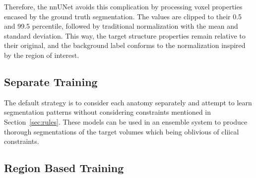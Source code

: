\documentclass[12pt,twoside]{report}
\begin{document}
Therefore, the nnUNet avoids this complication by processing voxel properties encased by the ground truth segmentation. The values are clipped to their 0.5 and 99.5 percentile, followed by traditional normalization with the mean and standard deviation. This way, the target structure properties remain relative to their original, and the background label conforms to the normalization inspired by the region of interest.

\subsection{Separate Training}

The default strategy is to consider each anatomy separately and attempt to learn segmentation patterns without considering constraints mentioned in Section~\ref{sec:rules}. These models can be used in an ensemble system to produce thorough segmentations of the target volumes which being oblivious of cliical constraints. 

\subsection{Region Based Training}
\end{document}
